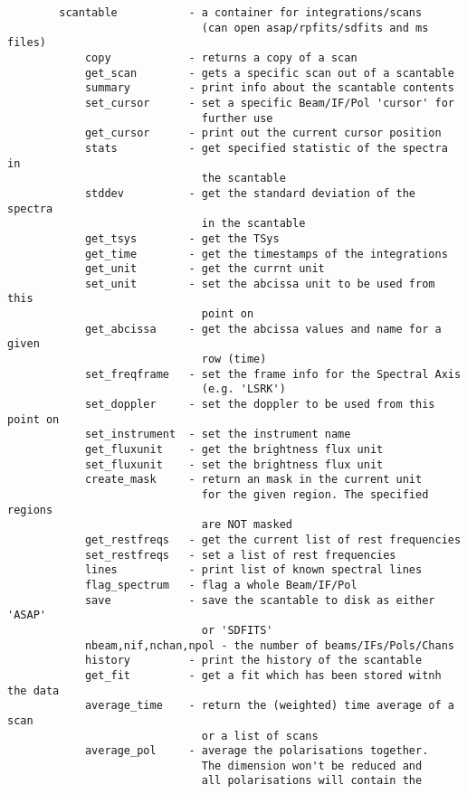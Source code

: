 \documentclass[11pt]{article}
\begin{document}
\begin{verbatim}
        scantable           - a container for integrations/scans
                              (can open asap/rpfits/sdfits and ms files)
            copy            - returns a copy of a scan
            get_scan        - gets a specific scan out of a scantable
            summary         - print info about the scantable contents
            set_cursor      - set a specific Beam/IF/Pol 'cursor' for
                              further use
            get_cursor      - print out the current cursor position
            stats           - get specified statistic of the spectra in
                              the scantable
            stddev          - get the standard deviation of the spectra
                              in the scantable
            get_tsys        - get the TSys
            get_time        - get the timestamps of the integrations
            get_unit        - get the currnt unit
            set_unit        - set the abcissa unit to be used from this
                              point on
            get_abcissa     - get the abcissa values and name for a given
                              row (time)
            set_freqframe   - set the frame info for the Spectral Axis
                              (e.g. 'LSRK')
            set_doppler     - set the doppler to be used from this point on
            set_instrument  - set the instrument name
            get_fluxunit    - get the brightness flux unit
            set_fluxunit    - set the brightness flux unit
            create_mask     - return an mask in the current unit
                              for the given region. The specified regions
                              are NOT masked
            get_restfreqs   - get the current list of rest frequencies
            set_restfreqs   - set a list of rest frequencies
            lines           - print list of known spectral lines
            flag_spectrum   - flag a whole Beam/IF/Pol
            save            - save the scantable to disk as either 'ASAP'
                              or 'SDFITS'
            nbeam,nif,nchan,npol - the number of beams/IFs/Pols/Chans
            history         - print the history of the scantable
            get_fit         - get a fit which has been stored witnh the data
            average_time    - return the (weighted) time average of a scan 
                              or a list of scans
            average_pol     - average the polarisations together.
                              The dimension won't be reduced and
                              all polarisations will contain the

\end{verbatim}
\end{document}
